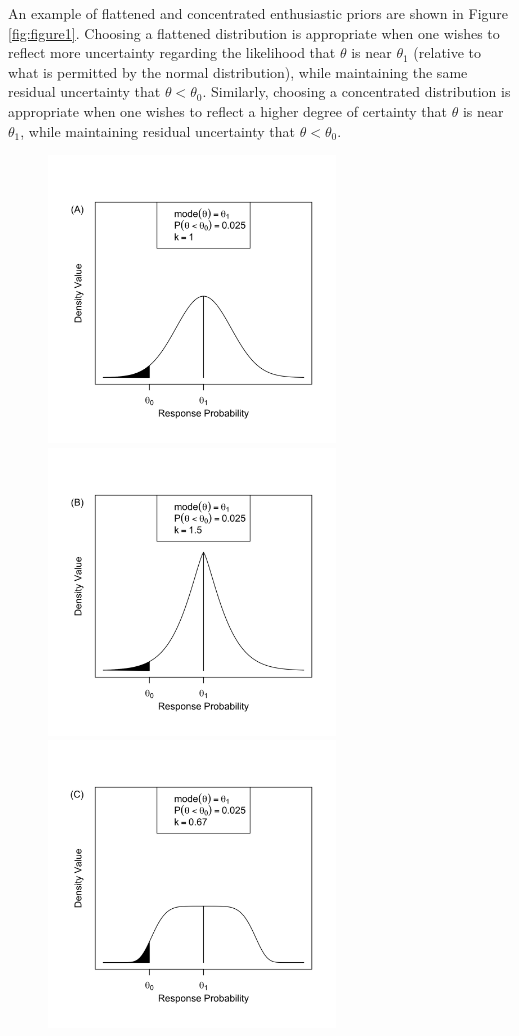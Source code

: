 \documentclass[useAMS,usenatbib,referee]{biom}
\begin{document}
An example of flattened and concentrated enthusiastic priors are shown in Figure \ref{fig:figure1}. 
%
Choosing a flattened distribution is appropriate {when one wishes to reflect more uncertainty regarding the likelihood that 
$\theta$ is near $\theta_1$ (relative to what is permitted by the normal distribution), while maintaining the same residual uncertainty 
that $\theta<\theta_0$}. 
%
Similarly, choosing a concentrated distribution is appropriate {when one wishes to reflect} a higher 
degree of certainty that $\theta$ is near $\theta_1$, while maintaining residual uncertainty that $\theta<\theta_0$. 
\begin{figure}
\begin{center}
\includegraphics[width=3in]{figure1a.png}
\includegraphics[width=3in]{figure1b.png}
\includegraphics[width=3in]{figure1c.png}

\end{center}
\end{figure}
\end{document}
